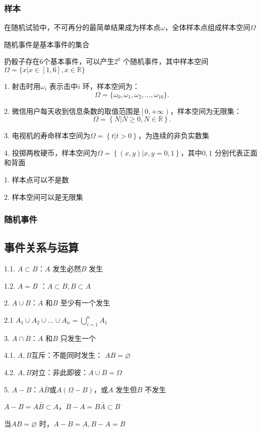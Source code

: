 \subsubsection{样本}%
\label{subsub:样本}
在随机试验中，不可再分的最简单结果成为样本点$\omega$，全体样本点组成样本空间$\Omega$
\begin{notation}
    随机事件是基本事件的集合
\end{notation}
\begin{eg}
    扔骰子存在6个基本事件，可以产生$2^6$ 个随机事件，其中样本空间$\Omega=\{x|x\in \left[ 1,6 \right] ,x\in \mathbb{R}\}$
\end{eg}
\begin{eg}
    1. 射击时用$\omega_i$ 表示击中$i$ 环，样本空间为：\[
        \Omega=\{\omega_0,\omega_1,\omega_2,\ldots,\omega_{10}\}
    .\]

    2. 微信用户每天收到信息条数的取值范围是$\left[ 0,+\infty \right) $，样本空间为无限集：\[
        \Omega=\left\{ N|N\ge 0 ,N\in \mathbb{R}\right\} 
    .\] 

    3. 电视机的寿命样本空间为$\Omega=\left\{ t|t>0 \right\} $，为连续的非负实数集

    4. 投掷两枚硬币，样本空间为$\Omega=\left\{ \left( x,y \right) |x,y=0,1 \right\} $，其中$0,1$ 分别代表正面和背面
\end{eg}
\begin{notation}
    1. 样本点可以不是数

    2. 样本空间可以是无限集
\end{notation}
\subsubsection{随机事件}%
\label{subsub:随机事件}
\subsection{事件关系与运算}%
\label{sub:事件关系与运算}
1.1. $A\subset B$：$A$ 发生必然$B$ 发生

1.2. $A=B$ ：$A\subset B, B\subset A$ 

2. $A\cup B$：$A$ 和$B$ 至少有一个发生

2.1 $A_1\cup A_2\cup \ldots\cup A_n=\bigcup_{i=1}^{n}A_1$

3. $A\cap B$：$A$ 和$B$ 只发生一个

4.1. $A,B$互斥：不能同时发生： $AB=\varnothing$

4.2. $A,B$对立：非此即彼：$A\cup B=\Omega$

5. $A-B$：$A \bar{B}$或$A(\Omega-B)$，或$A$ 发生但$B$ 不发生
\begin{notation}
    $A-B=A\bar{B}\subset A$，$B-A=B\bar{A}\subset B$

    当$AB=\varnothing$ 时，$A-B= A,B-A=B$
\end{notation}

